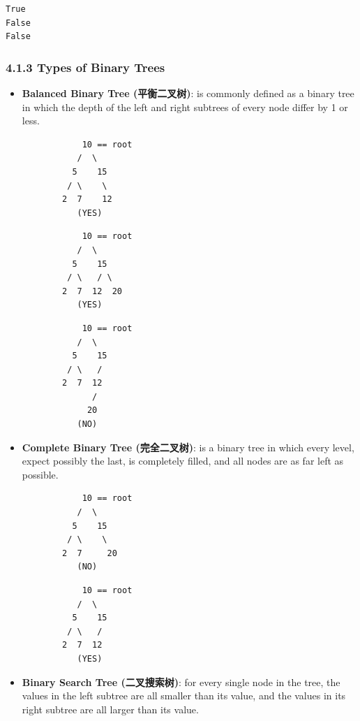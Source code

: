 \documentclass[11pt]{article}
\begin{document}
    \begin{Verbatim}[commandchars=\\\{\}]
True
False
False

    \end{Verbatim}

    \subsubsection{4.1.3 Types of Binary Trees}\label{types-of-binary-trees}

\begin{itemize}
\item
  \textbf{Balanced Binary Tree (平衡二叉树)}: is commonly defined as a
  binary tree in which the depth of the left and right subtrees of every
  node differ by 1 or less.

\begin{verbatim}
            10 == root
           /  \
          5    15
         / \    \ 
        2  7    12 
           (YES)
\end{verbatim}

\begin{verbatim}
            10 == root
           /  \
          5    15
         / \   / \ 
        2  7  12  20
           (YES)
\end{verbatim}

\begin{verbatim}
            10 == root
           /  \
          5    15
         / \   /  
        2  7  12 
              /
             20
           (NO)
\end{verbatim}
\item
  \textbf{Complete Binary Tree (完全二叉树)}: is a binary tree in which
  every level, expect possibly the last, is completely filled, and all
  nodes are as far left as possible.

\begin{verbatim}
            10 == root
           /  \
          5    15
         / \    \ 
        2  7     20
           (NO)
\end{verbatim}

\begin{verbatim}
            10 == root
           /  \
          5    15
         / \   / 
        2  7  12  
           (YES)
\end{verbatim}
\item
  \textbf{Binary Search Tree (二叉搜索树)}: for every single node in the
  tree, the values in the left subtree are all smaller than its value,
  and the values in its right subtree are all larger than its value.


\end{itemize}
\end{document}
